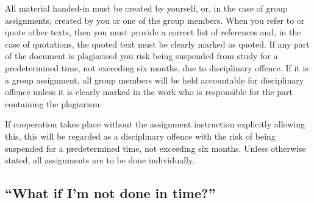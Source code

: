 All material handed-in must be created by yourself, or, in the case of group 
assignments, created by you or one of the group members.
When you refer to or quote other texts, then you must provide a correct list of 
references and, in the case of quotations, the quoted text must be clearly 
marked as quoted.
If any part of the document is plagiarised you risk being suspended from study 
for a predetermined time, not exceeding six months, due to disciplinary 
offence.
If it is a group assignment, all group members will be held accountable for 
disciplinary offence unless it is clearly marked in the work who is responsible 
for the part containing the plagiarism.

If cooperation takes place without the assignment instruction explicitly 
allowing this, this will be regarded as a disciplinary offence with the risk of
being suspended for a predetermined time, not exceeding six months.
Unless otherwise stated, all assignments are to be done individually.

\subsection{\enquote{What if I'm not done in time?}}%
\label{sec:late}



\printbibliography{}
